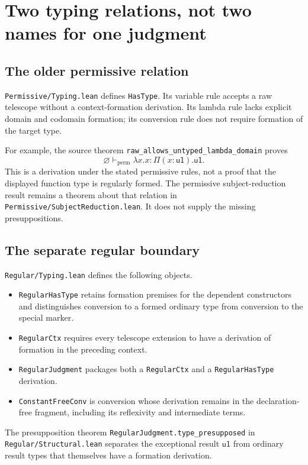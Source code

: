 \documentclass[11pt]{article}
\newcommand{\code}[1]{\nolinkurl{#1}}
\newcommand{\uO}{\mathsf{u1}}
\newcommand{\raw}{\vdash_{\mathrm{perm}}}
\begin{document}
\section{Two typing relations, not two names for one judgment}
\label{sec:judgments}

\subsection{The older permissive relation}

\code{Permissive/Typing.lean} defines \code{HasType}.
Its variable rule accepts a raw telescope without a context-formation
derivation. Its lambda rule lacks explicit domain and codomain formation;
its conversion rule does not require formation of the target type.

For example, the source theorem
\code{raw_allows_untyped_lambda_domain} proves
\[
 \varnothing\raw\lambda x.x:\Pi(x:\uO).\uO .
\]
This is a derivation under the stated permissive rules, not a proof that the
displayed function type is regularly formed. The permissive subject-reduction
result remains a theorem about that relation in
\code{Permissive/SubjectReduction.lean}. It does not supply the missing
presuppositions.

\subsection{The separate regular boundary}

\code{Regular/Typing.lean} defines the following objects.
\begin{itemize}[nosep]
  \item \code{RegularHasType} retains formation premises for the dependent
  constructors and distinguishes conversion to a formed ordinary type from
  conversion to the special marker.
  \item \code{RegularCtx} requires every telescope extension to have a
  derivation of formation in the preceding context.
  \item \code{RegularJudgment} packages both a \code{RegularCtx} and a
  \code{RegularHasType} derivation.
  \item \code{ConstantFreeConv} is conversion whose derivation remains in the
  declaration-free fragment, including its reflexivity and intermediate terms.
\end{itemize}

The presupposition theorem \code{RegularJudgment.type_presupposed} in
\code{Regular/Structural.lean} separates the exceptional result $\uO$ from
ordinary result types that themselves have a formation derivation.
\end{document}
